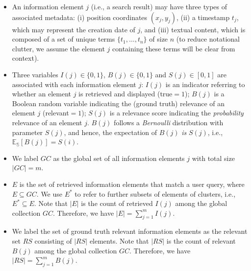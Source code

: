 \begin{itemize}
\item An information element $j$ (i.e., a search result) may have three types of associated metadata: (i) position coordinates $(x_{j},y_{j})$, (ii) a timestamp $t_j$, which may represent the creation date of $j$, and (iii) textual content, which is composed of a set of unique terms $\{ t_1,\ldots,t_n \}$ of size $n$ (to reduce notational clutter, we assume the element $j$ containing these terms will be clear from context).
\item Three variables $I(j) \in \{0,1\}$, $B(j) \in \{0,1\}$ and $S(j) \in [0,1]$ are associated with each information element $j$: $I(j)$ is an indicator referring to whether an element $j$ is retrieved and displayed (true$=1$); $B(j)$ is a Boolean random variable indicating the (ground truth) relevance of an element $j$ (relevant$=1$); $S(j)$ is a relevance score indicating the \emph{probability} relevance of an element $j$. %
$B(j)$ follows a \emph{Bernoulli} distribution with parameter $S(j)$, and hence, the expectation of $B(j)$ \emph{is} $S(j)$, i.e., 
  $\mathbb{E_S}[B(j)] = S(i)$.
\item We label $GC$ as the global set of all information elements $j$ with total size $|GC|=m$. %
\item $E$ is the set of retrieved information elements that match a user query, where $E \subseteq  GC$.  We use $E^*$ to refer to further subsets of elements of clusters, i.e., $E^*\subseteq E$. 
Note that $|E|$ is the count of retrieved $I(j)$ among the global collection $GC$. Therefore, we have $|E| = \sum_{j=1}^m I(j)$.
\item We label the set of ground truth relevant information elements as the relevant set $RS$ consisting of $|RS|$ elements. 
Note that $|RS|$ is the count of relevant $B(j)$ among the global collection $GC$. Therefore, we have $|RS| = \sum_{j=1}^m B(j)$. %


\end{itemize}
